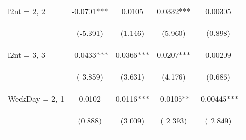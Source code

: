 \documentclass[]{standalone}
\begin{document}
\begin{tabular}{lcccc}
    l2nt = 2, 2      & -0.0701***                                     & 0.0105                                         & 0.0332***                                      & 0.00305                                        \\
    \vspace{4pt}     & \begin{footnotesize}(-5.391)\end{footnotesize} & \begin{footnotesize}(1.146)\end{footnotesize}  & \begin{footnotesize}(5.960)\end{footnotesize}  & \begin{footnotesize}(0.898)\end{footnotesize}  \\
    l2nt = 3, 3      & -0.0433***                                     & 0.0366***                                      & 0.0207***                                      & 0.00209                                        \\
    \vspace{4pt}     & \begin{footnotesize}(-3.859)\end{footnotesize} & \begin{footnotesize}(3.631)\end{footnotesize}  & \begin{footnotesize}(4.176)\end{footnotesize}  & \begin{footnotesize}(0.686)\end{footnotesize}  \\
    WeekDay = 2, 1   & 0.0102                                         & 0.0116***                                      & -0.0106**                                      & -0.00445***                                    \\
    \vspace{4pt}     & \begin{footnotesize}(0.888)\end{footnotesize}  & \begin{footnotesize}(3.009)\end{footnotesize}  & \begin{footnotesize}(-2.393)\end{footnotesize} & \begin{footnotesize}(-2.849)\end{footnotesize} \\

\end{tabular}
\end{document}
